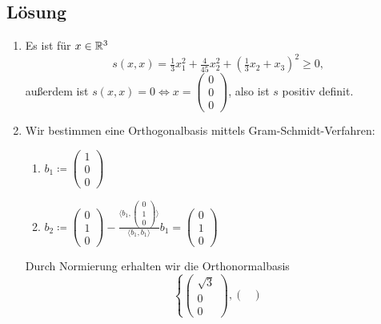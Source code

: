 \subsection{Lösung}
\begin{enumerate}
	\item Es ist für \( x \in \mathbb{R}^3 \)
		\begin{equation*}
		 	s(x,x) = \tfrac{1}{3}x_1^2+\tfrac{4}{45}x_2^2+(\tfrac{1}{3}x_2+x_3)^2 \geq 0\text{,}
		 \end{equation*} 
		 außerdem ist \( s(x,x)  = 0 \Leftrightarrow x = \left( \begin{smallmatrix}
		 	 0 \\ 0 \\ 0
		 \end{smallmatrix} \right) \), also ist \( s \) positiv definit.
	\item Wir bestimmen eine Orthogonalbasis mittels Gram-Schmidt-Verfahren:
		\begin{enumerate}
			\item \( b_1 \coloneqq \left( \begin{smallmatrix}
				1 \\ 0 \\ 0
			\end{smallmatrix} \right) \) 
			\item \( b_2 \coloneqq \left( \begin{smallmatrix}
				0 \\ 1 \\ 0
			\end{smallmatrix} \right) - \tfrac{\langle b_1, \left( \begin{smallmatrix}
				0 \\ 1 \\ 0
			\end{smallmatrix} \right) \rangle}{\langle b_1,b_1 \rangle}b_1 = \left( \begin{smallmatrix}
				0 \\ 1 \\ 0
			\end{smallmatrix} \right) \)
		\end{enumerate}
		Durch Normierung erhalten wir die Orthonormalbasis 
		\begin{equation*}
			\left\{ \begin{pmatrix}
				\sqrt{3} \\ 0 \\ 0
			\end{pmatrix}, \begin{pmatrix}

\end{pmatrix}
\end{equation*}
\end{enumerate}
